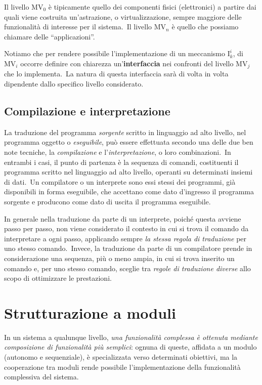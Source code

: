 Il livello $\mathrm{MV}_0$ è tipicamente quello dei componenti fisici (elettronici) a partire dai quali viene costruita un'astrazione, o virtualizzazione, sempre maggiore delle funzionalità di interesse per il sistema.\
Il livello $\mathrm{MV}_n$ è quello che possiamo chiamare delle ``applicazioni''.

Notiamo che per rendere possibile l'implementazione di un meccanismo $\mathrm{I}_k^i$, di $\mathrm{MV}_i$ occorre definire con chiarezza un'\textbf{interfaccia} nei confronti del livello $\mathrm{MV}_j$ che lo implementa.\
La natura di questa interfaccia sarà di volta in volta dipendente dallo specifico livello considerato.

\subsection{Compilazione e interpretazione}

La traduzione del programma \textit{sorgente} scritto in linguaggio ad alto livello, nel programma oggetto o \textit{eseguibile}, può essere effettuata secondo una delle due ben note tecniche, la \textit{compilazione} e l'\textit{interpretazione}, o loro combinazioni.\
In entrambi i casi, il punto di partenza è la sequenza di comandi, costituenti il programma scritto nel linguaggio ad alto livello, operanti su determinati insiemi di dati.\
Un compilatore o un interprete sono essi stessi dei programmi, già disponibili in forma eseguibile, che accettano come dato d'ingresso il programma sorgente e producono come dato di uscita il programma eseguibile.

In generale nella traduzione da parte di un interprete, poiché questa avviene passo per passo, non viene considerato il contesto in cui si trova il comando da interpretare a ogni passo, applicando sempre \textit{la stessa regola di traduzione} per uno stesso comando.\
Invece, la traduzione da parte di un compilatore prende in considerazione una sequenza, più o meno ampia, in cui si trova inserito un comando e, per uno stesso comando, sceglie tra \textit{regole di traduzione diverse} allo scopo di ottimizzare le prestazioni.

\section{Strutturazione a moduli}

In un sistema a qualunque livello, \textit{una funzionalità complessa è ottenuta mediante composizione di funzionalità più semplici}: ognuna di queste, affidata a un modulo (autonomo e sequenziale), è specializzata verso determinati obiettivi, ma la cooperazione tra moduli rende possibile l'implementazione della funzionalità complessiva del sistema.

